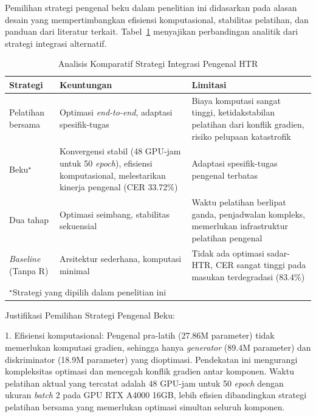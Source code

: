 \documentclass[journal]{IEEEtran}
\begin{document}
Pemilihan strategi pengenal beku dalam penelitian ini didasarkan pada alasan desain yang mempertimbangkan efisiensi komputasional, stabilitas pelatihan, dan panduan dari literatur terkait. Tabel~\ref{table_ablation_recognizer_strategy} menyajikan perbandingan analitik dari strategi integrasi alternatif.

\begin{table}[!t]
\renewcommand{\arraystretch}{1.2}
\caption{Analisis Komparatif Strategi Integrasi Pengenal HTR}
\label{table_ablation_recognizer_strategy}
\centering
\small
\begin{tabular}{|p{2.5cm}|p{2.2cm}|p{2.5cm}|}
\hline
\textbf{Strategi} & \textbf{Keuntungan} & \textbf{Limitasi} \\
\hline
Pelatihan bersama & Optimasi \textit{end-to-end}, adaptasi spesifik-tugas & Biaya komputasi sangat tinggi, ketidakstabilan pelatihan dari konflik gradien, risiko pelupaan katastrofik~\cite{kirkpatrick2017overcoming} \\
\hline
Beku$^\star$ & Konvergensi stabil (48 GPU-jam untuk 50 \textit{epoch}), efisiensi komputasional, melestarikan kinerja pengenal (CER 33.72\%) & Adaptasi spesifik-tugas pengenal terbatas \\
\hline
Dua tahap & Optimasi seimbang, stabilitas sekuensial & Waktu pelatihan berlipat ganda, penjadwalan kompleks, memerlukan infrastruktur pelatihan pengenal \\
\hline
\textit{Baseline} (Tanpa R) & Arsitektur sederhana, komputasi minimal & Tidak ada optimasi sadar-HTR, CER sangat tinggi pada masukan terdegradasi (83.4\%) \\
\hline
\multicolumn{3}{|l|}{\footnotesize $^\star$Strategi yang dipilih dalam penelitian ini} \\
\hline
\end{tabular}
\end{table}

Justifikasi Pemilihan Strategi Pengenal Beku:

1. Efisiensi komputasional: Pengenal pra-latih (27.86M parameter) tidak memerlukan komputasi gradien, sehingga hanya \textit{generator} (89.4M parameter) dan diskriminator (18.9M parameter) yang dioptimasi. Pendekatan ini mengurangi kompleksitas optimasi dan mencegah konflik gradien antar komponen. Waktu pelatihan aktual yang tercatat adalah 48 GPU-jam untuk 50 \textit{epoch} dengan ukuran \textit{batch} 2 pada GPU RTX A4000 16GB, lebih efisien dibandingkan strategi pelatihan bersama yang memerlukan optimasi simultan seluruh komponen.
\end{document}
